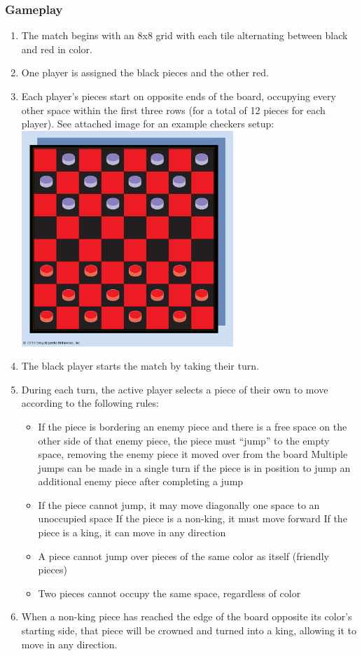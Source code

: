 \documentclass[10pt]{article}
\begin{document}
\subsubsection{Gameplay}
\begin{enumerate}[label*=G\arabic*.]
	\item The match begins with an 8x8 grid with each tile alternating between black and red in color.
	\item One player is assigned the black pieces and the other red.
	\item Each player’s pieces start on opposite ends of the board, occupying every other space within the first three rows (for a total of 12 pieces for each player).
	\subitem See attached image for an example checkers setup:
	\subitem \includegraphics[width=8cm]{board.png}
	\item The black player starts the match by taking their turn.
	\item During each turn, the active player selects a piece of their own to move according to the following rules:
\begin{itemize}
    \item If the piece is bordering an enemy piece and there is a free space on the other side of that enemy piece, the piece must “jump” to the empty space, removing the enemy piece it moved over from the board
        \subitem Multiple jumps can be made in a single turn if the piece is in position to jump an additional enemy piece after completing a jump
    \item If the piece cannot jump, it may move diagonally one space to an unoccupied space
        \subitem If the piece is a non-king, it must move forward
        \subitem If the piece is a king, it can move in any direction
    \item A piece cannot jump over pieces of the same color as itself (friendly pieces)
    \item Two pieces cannot occupy the same space, regardless of color
\end{itemize}

\item When a non-king piece has reached the edge of the board opposite its color’s starting side, that piece will be crowned and turned into a king, allowing it to move in any direction.
\end{enumerate}
\end{document}
